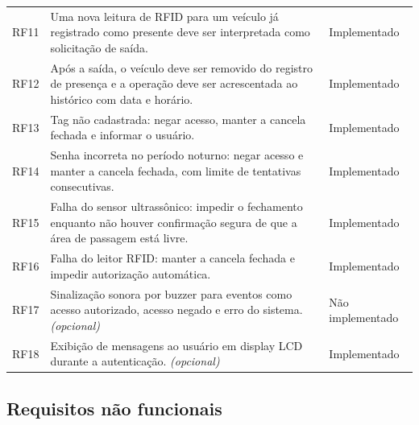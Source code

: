 \documentclass[11pt,a4paper]{article}
\begin{document}
\begin{longtable}{@{}p{1.3cm}L{9.5cm}p{3.3cm}@{}}
RF11 & Uma nova leitura de RFID para um veículo já registrado como presente
deve ser interpretada como solicitação de saída.
& Implementado \\[4pt]

RF12 & Após a saída, o veículo deve ser removido do registro de presença e a
operação deve ser acrescentada ao histórico com data e horário.
& Implementado \\[4pt]

RF13 & Tag não cadastrada: negar acesso, manter a cancela fechada e informar o
usuário.
& Implementado \\[4pt]

RF14 & Senha incorreta no período noturno: negar acesso e manter a cancela
fechada, com limite de tentativas consecutivas.
& Implementado \\[4pt]

RF15 & Falha do sensor ultrassônico: impedir o fechamento enquanto não houver
confirmação segura de que a área de passagem está livre.
& Implementado \\[4pt]

RF16 & Falha do leitor RFID: manter a cancela fechada e impedir autorização
automática.
& Implementado \\[4pt]

RF17 & Sinalização sonora por buzzer para eventos como acesso autorizado, acesso
negado e erro do sistema. \textit{(opcional)}
& Não implementado \\[4pt]

RF18 & Exibição de mensagens ao usuário em display LCD durante a autenticação.
\textit{(opcional)}
& Implementado \\
\end{longtable}

\subsection{Requisitos não funcionais}
\end{document}
